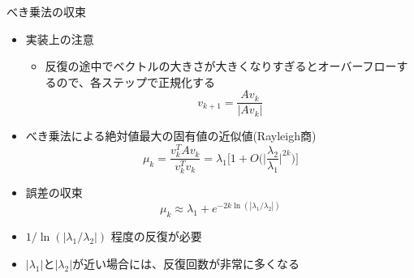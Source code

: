 \begin{frame}[t,fragile]{べき乗法の収束}
  \begin{itemize}
  \item 実装上の注意
  \begin{itemize}
    \item 反復の途中でベクトルの大きさが大きくなりすぎるとオーバーフローするので、各ステップで正規化する
      \[
      v_{k+1} = \frac{A v_k}{|A v_k|}
      \]
  \end{itemize}
  \item べき乗法による絶対値最大の固有値の近似値(Rayleigh商)
    \[
    \mu_k = \frac{v_{k}^T A v_{k}}{v_{k}^T v_k} = \lambda_1 \Big[ 1 + O\Big( \big|\frac{\lambda_2}{\lambda_1} \big|^{2k} \Big) \Big]
    \]
  \item 誤差の収束
    \[
    \mu_k  \approx \lambda_1 + e^{-2k \ln (|\lambda_1/\lambda_2|)}
    \]
  \item $1 / \ln (|\lambda_1/\lambda_2|)$ 程度の反復が必要
  \item $|\lambda_1|$と$|\lambda_2|$が近い場合には、反復回数が非常に多くなる
  \end{itemize}
\end{frame}

